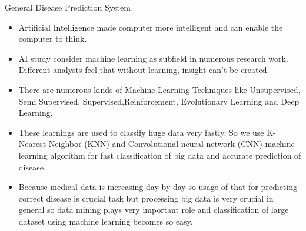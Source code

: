\documentclass{SKP-beamer}
\begin{document}
\begin{frame}{General Disease Prediction System}
	\begin{itemize}
	\item Artificial Intelligence made computer more intelligent and can
	enable the computer to think. 
	\item AI study consider machine learning as subfield in numerous research work. Different
	analysts feel that without learning, insight can't be created.
	\item There are numerous kinds of Machine Learning Techniques
	like Unsupervised, Semi Supervised, Supervised,Reinforcement, Evolutionary Learning and Deep Learning.
	\item These learnings are used to classify huge data very fastly. So
	we use K-Nearest Neighbor (KNN) and Convolutional neural
	network (CNN) machine learning algorithm for fast
	classification of big data and accurate prediction of disease.
	\item Because medical data is increasing day by day so usage of that
	for predicting correct disease is crucial task but processing big
	data is very crucial in general so data mining plays very
	important role and classification of large dataset using
	machine learning becomes so easy.
\end{itemize}
\end{frame}
\end{document}
